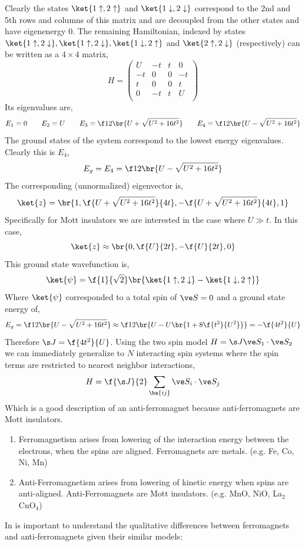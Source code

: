 \documentclass{article}
\newcommand{\uu}{\uparrow}
\newcommand{\dd}{\downarrow}
\begin{document}
Clearly the states $\ket{1 \uu, 2 \uu}$ and $\ket{1 \dd, 2 \dd}$ correspond to the 2nd and 5th rows and columns of this matrix and are decoupled from the other states and have eigenenergy $0$. The remaining Hamiltonian, indexed by states $\ket{1 \uu, 2 \dd}, \ket{1 \uu, 2 \dd}, \ket{1 \dd, 2 \uu}$ and $\ket{2 \uu, 2 \dd}$ (respectively) can be written as a $4 \times 4$ matrix,
\[ H = \begin{pmatrix}
    U & -t & t & 0 \\
    -t & 0 & 0 & -t \\
    t & 0 & 0 & t \\
    0 & -t & t & U \\
\end{pmatrix} \]
Its eigenvalues are,
\[ E_1 = 0 \qquad E_2 = U \qquad E_3 = \f12 \br{U + \sqrt{U^2 + 16t^2}} \qquad E_4 = \f12 \br{U - \sqrt{U^2 + 16t^2}} \]
The ground states of the system correspond to the lowest energy eigenvalues. Clearly this is $E_4$,
\[ E_g = E_4 = \f12 \br{U - \sqrt{U^2 + 16t^2}} \]
The corresponding (unnormalized) eigenvector is,
\[ \ket{z} = \br{1, \f{U + \sqrt{U^2 + 16t^2}}{4t}, -\f{U + \sqrt{U^2 + 16t^2}}{4t}, 1} \]
Specifically for Mott insulators we are interested in the case where $U \gg t$. In this case,
\[ \ket{z} \approx \br{0, \f{U}{2t}, -\f{U}{2t}, 0} \]
This ground state wavefunction is,
\[ \ket{\psi} = \f{1}{\sqrt{2}} \br{\ket{1\uu, 2 \dd} - \ket{1 \dd, 2 \uu}} \]
Where $\ket{\psi}$ corresponded to a total spin of $\ve S = 0$ and a ground state energy of,
\[ E_g = \f12 \br{U - \sqrt{U^2 + 16t^2}} \approx \f12 \br{U - U\br{1 + 8\f{t^2}{U^2}}} = - \f{4t^2}{U} \]
Therefore $\s J = \f{4 t^2}{U}$. Using the two spin model $H = \s J \ve S_1 \cdot \ve S_2$ we can immediately generalize to $N$ interacting spin systems where the spin terms are restricted to nearest neighbor interactions,
\[ H = \f{\s J}{2} \sum_{\ba{ij}} \ve S_i \cdot \ve S_j \]
Which is a good description of an anti-ferromagnet because anti-ferromagnets are Mott insulators.
\begin{enumerate}
    \item Ferromagnetism arises from lowering of the interaction energy between the electrons, when the spins are aligned. Ferromagnets are metals. (e.g. Fe, Co, Ni, Mn)
    \item Anti-Ferromagnetism arises from lowering of kinetic energy when spins are anti-aligned. Anti-Ferromagnets are Mott insulators. (e.g. MnO, NiO, La$_2$CnO$_4$)
\end{enumerate}
In is important to understand the qualitative differences between ferromagnets and anti-ferromagnets given their similar models:\\
\end{document}
